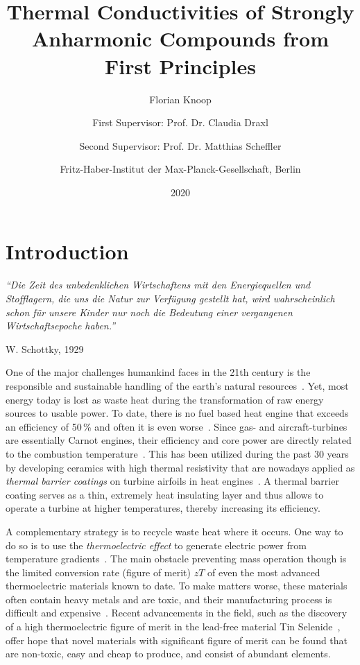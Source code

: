 \documentclass[a4paper,12pt]{book}
\title{
    Thermal Conductivities of Strongly Anharmonic Compounds from First Principles
}
\author{
    Florian Knoop
    \\ \and
    First Supervisor: Prof. Dr. Claudia Draxl
    \and
    Second Supervisor: Prof. Dr. Matthias Scheffler
    \\ \and
    Fritz-Haber-Institut der Max-Planck-Gesellschaft, Berlin
}
\date{2020}
\begin{document}
\maketitle
\tableofcontents

\chapter{Introduction}
\epigraph{\singlespacing \it ``Die Zeit des unbedenklichen Wirtschaftens mit den Energiequellen und Stofflagern, die uns die Natur zur Verfügung gestellt hat, wird wahrscheinlich schon für unsere Kinder nur noch die Bedeutung einer vergangenen Wirtschaftsepoche haben.''}{W. Schottky, 1929}
One of the major challenges humankind faces in the 21th century is the responsible and sustainable handling of the earth's natural resources~\cite{Schottky1929}.  Yet, most energy today is lost as waste heat during the transformation of raw energy sources to usable power. To date, there is no fuel based heat engine that exceeds an efficiency of 50\,\% and often it is even worse~\cite{eia}. 
Since gas- and aircraft-turbines are essentially Carnot engines, their efficiency and core power are directly related to the combustion temperature~\cite{Clarke2012,Perepezko2009}. This has been utilized during the past 30 years by developing 
ceramics with high thermal resistivity that are nowadays applied as \emph{thermal barrier coatings} on turbine airfoils in heat engines~\cite{Clarke2003}. A thermal barrier coating serves as a thin, extremely heat insulating layer and thus allows to operate a turbine at higher temperatures, thereby increasing its efficiency.

A complementary strategy is to recycle waste heat where it occurs. One way to do so is to use the
\emph{thermoelectric effect} to  generate electric power from temperature gradients~\cite{Snyder2008}. The main obstacle preventing mass operation though is the limited conversion rate (figure of merit) $zT$ of even the most advanced thermoelectric materials known to date. To make matters worse, these materials often contain heavy metals and are toxic, and their manufacturing process is difficult and expensive~\cite{Nolas2001}. Recent advancements in the field, such as the discovery of a high thermoelectric figure of merit in the lead-free material Tin Selenide~\cite{Zhao2014}, offer hope that novel materials with significant figure of merit can be found that are non-toxic, easy and cheap to produce, and consist of abundant elements.
\end{document}
